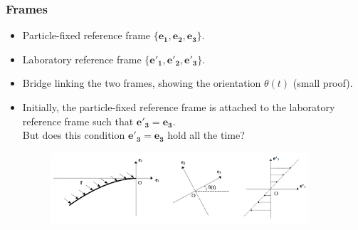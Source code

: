 \documentclass{beamer}
\begin{document}
\begin{frame}
	\frametitle{Frames}
	\begin{overlayarea}{\textwidth}{\textheight}
\begin{itemize}
	\item  Particle-fixed reference frame $\{\mathbf{e_1},\mathbf{e_2},\mathbf{e_3}\}$.
	\item Laboratory reference frame $\{\mathbf{e'_1},\mathbf{e'_2},\mathbf{e'_3}\}$.
	\item Bridge linking the two frames, showing the orientation $\theta(t)$ (small proof).
	\item Initially, the particle-fixed reference frame is attached to the laboratory reference frame such that $\mathbf{e'_3}=\mathbf{e_3}$. \\\vspace{0.3cm}But does this condition $\mathbf{e'_3}=\mathbf{e_3}$ hold all the time?
	\begin{figure}[htb]
		\begin{center}
			\includegraphics[width=0.9\textwidth]{plots/frames_general.png}
		\end{center}
	\end{figure}
\end{itemize}
	\end{overlayarea}
\end{frame}

\end{document}
